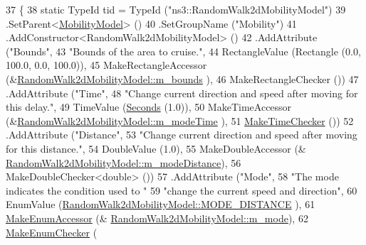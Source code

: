 \begin{DoxyCode}
37 \{
38   \textcolor{keyword}{static} TypeId tid = TypeId (\textcolor{stringliteral}{"ns3::RandomWalk2dMobilityModel"})
39     .SetParent<\hyperlink{classns3_1_1MobilityModel_af61ca3dbc723d8109d115fb081fd0299}{MobilityModel}> ()
40     .SetGroupName (\textcolor{stringliteral}{"Mobility"})
41     .AddConstructor<RandomWalk2dMobilityModel> ()
42     .AddAttribute (\textcolor{stringliteral}{"Bounds"},
43                    \textcolor{stringliteral}{"Bounds of the area to cruise."},
44                    RectangleValue (Rectangle (0.0, 100.0, 0.0, 100.0)),
45                    MakeRectangleAccessor (&\hyperlink{classns3_1_1RandomWalk2dMobilityModel_ae0f3bcf061463a6f6245e22f47c560dc}{RandomWalk2dMobilityModel::m\_bounds}
      ),
46                    MakeRectangleChecker ())
47     .AddAttribute (\textcolor{stringliteral}{"Time"},
48                    \textcolor{stringliteral}{"Change current direction and speed after moving for this delay."},
49                    TimeValue (\hyperlink{group__timecivil_ga33c34b816f8ff6628e33d5c8e9713b9e}{Seconds} (1.0)),
50                    MakeTimeAccessor (&\hyperlink{classns3_1_1RandomWalk2dMobilityModel_acdb52478fc06ca86ec0d0c5458fe1955}{RandomWalk2dMobilityModel::m\_modeTime}
      ),
51                    \hyperlink{group__time_ga7032965bd4afa578691d88c09e4481c1}{MakeTimeChecker} ())
52     .AddAttribute (\textcolor{stringliteral}{"Distance"},
53                    \textcolor{stringliteral}{"Change current direction and speed after moving for this distance."},
54                    DoubleValue (1.0),
55                    MakeDoubleAccessor (&
      \hyperlink{classns3_1_1RandomWalk2dMobilityModel_a4d4a9290a22236967822e8b8bdbe68a1}{RandomWalk2dMobilityModel::m\_modeDistance}),
56                    MakeDoubleChecker<double> ())
57     .AddAttribute (\textcolor{stringliteral}{"Mode"},
58                    \textcolor{stringliteral}{"The mode indicates the condition used to "}
59                    \textcolor{stringliteral}{"change the current speed and direction"},
60                    EnumValue (\hyperlink{classns3_1_1RandomWalk2dMobilityModel_a8b560f2a613c37d1bcd1c6204004801aad1b9605d05f240d1dc3e09f52c6c30f7}{RandomWalk2dMobilityModel::MODE\_DISTANCE}
      ),
61                    \hyperlink{namespacens3_af5050739867ce63896dec011e332c8ec}{MakeEnumAccessor} (&
      \hyperlink{classns3_1_1RandomWalk2dMobilityModel_a8a753c51d371a7d0c2a394e4a7cba3cf}{RandomWalk2dMobilityModel::m\_mode}),
62                    \hyperlink{namespacens3_a48832781a2b521d3d0091e05ece30615}{MakeEnumChecker} (

\end{DoxyCode}
